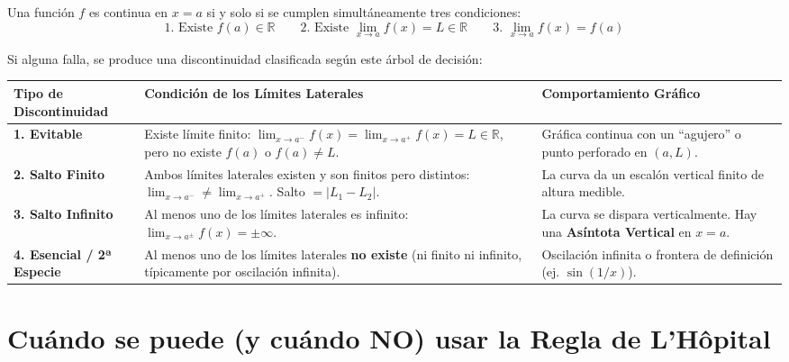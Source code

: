 \documentclass[10pt,a4paper]{article}
\begin{document}
Una función $f$ es continua en $x = a$ si y solo si se cumplen simultáneamente tres condiciones:
$$\text{1. Existe } f(a) \in \mathbb{R} \qquad \text{2. Existe } \lim_{x \to a} f(x) = L \in \mathbb{R} \qquad \text{3. } \lim_{x \to a} f(x) = f(a)$$

Si alguna falla, se produce una discontinuidad clasificada según este árbol de decisión:

\vspace{2mm}

\noindent
\renewcommand{\arraystretch}{1.3}
\small
\begin{tabularx}{\linewidth}{|l|X|X|}
\hline
\textbf{Tipo de Discontinuidad} & \textbf{Condición de los Límites Laterales} & \textbf{Comportamiento Gráfico} \\ \hline\hline
\textbf{1. Evitable} & Existe límite finito: $\lim_{x \to a^-} f(x) = \lim_{x \to a^+} f(x) = L \in \mathbb{R}$, pero no existe $f(a)$ o $f(a) \neq L$. & Gráfica continua con un ``agujero'' o punto perforado en $(a, L)$. \\ \hline
\textbf{2. Salto Finito} & Ambos límites laterales existen y son finitos pero distintos: $\lim_{x \to a^-} \neq \lim_{x \to a^+}$. Salto $= |L_1 - L_2|$. & La curva da un escalón vertical finito de altura medible. \\ \hline
\textbf{3. Salto Infinito} & Al menos uno de los límites laterales es infinito: $\lim_{x \to a^\pm} f(x) = \pm\infty$. & La curva se dispara verticalmente. Hay una \textbf{Asíntota Vertical} en $x = a$. \\ \hline
\textbf{4. Esencial / 2ª Especie} & Al menos uno de los límites laterales \textbf{no existe} (ni finito ni infinito, típicamente por oscilación infinita). & Oscilación infinita o frontera de definición (ej. $\sin(1/x)$). \\ \hline
\end{tabularx}

\vspace{5mm}

\section{Cuándo se puede (y cuándo NO) usar la Regla de L'Hôpital}
\end{document}
